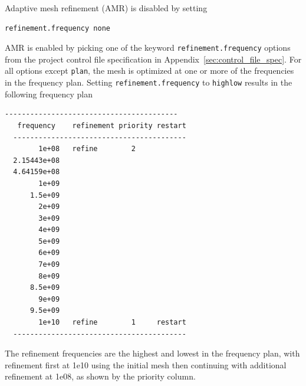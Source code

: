 \documentclass[titlepage]{article}
\renewcommand\_{\textunderscore\linebreak[1]}
\begin{document}
Adaptive mesh refinement (AMR) is disabled by setting 
\begin{Verbatim}[fontsize=\small]
  refinement.frequency none
\end{Verbatim}
AMR is enabled by picking one of the keyword \texttt{refinement.frequency} options from the project control file specification in Appendix~\ref{sec:control_file_spec}.  For all options except \texttt{plan}, the mesh is optimized at one or more of the frequencies in the frequency plan.  Setting \texttt{refinement.frequency} to \texttt{highlow} results in the following frequency plan
\begin{Verbatim}[fontsize=\small]
  -----------------------------------------
   frequency    refinement priority restart
  -----------------------------------------
        1e+08   refine        2
  2.15443e+08
  4.64159e+08
        1e+09
      1.5e+09
        2e+09
        3e+09
        4e+09
        5e+09
        6e+09
        7e+09
        8e+09
      8.5e+09
        9e+09
      9.5e+09
        1e+10   refine        1     restart
  -----------------------------------------
\end{Verbatim}
\noindent The refinement frequencies are the highest and lowest in the frequency plan, with refinement first at 1e10 using the initial mesh then continuing with additional refinement at 1e08, as shown by the priority column.
\end{document}

